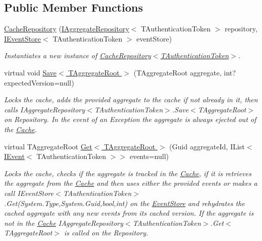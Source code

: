 \subsection*{Public Member Functions}
\begin{DoxyCompactItemize}
\item 
\hyperlink{classCqrs_1_1Cache_1_1CacheRepository_a6c567e999a85f5803a920ce4912833a9_a6c567e999a85f5803a920ce4912833a9}{Cache\+Repository} (\hyperlink{interfaceCqrs_1_1Domain_1_1IAggregateRepository}{I\+Aggregate\+Repository}$<$ T\+Authentication\+Token $>$ repository, \hyperlink{interfaceCqrs_1_1Events_1_1IEventStore}{I\+Event\+Store}$<$ T\+Authentication\+Token $>$ event\+Store)
\begin{DoxyCompactList}\small\item\em Instantiates a new instance of \hyperlink{classCqrs_1_1Cache_1_1CacheRepository_a6c567e999a85f5803a920ce4912833a9_a6c567e999a85f5803a920ce4912833a9}{Cache\+Repository$<$\+T\+Authentication\+Token$>$}. \end{DoxyCompactList}\item 
virtual void \hyperlink{classCqrs_1_1Cache_1_1CacheRepository_a69df7ee1dc2e4cd38431ab987655eab3_a69df7ee1dc2e4cd38431ab987655eab3}{Save$<$ T\+Aggregate\+Root $>$} (T\+Aggregate\+Root aggregate, int? expected\+Version=null)
\begin{DoxyCompactList}\small\item\em Locks the cache, adds the provided {\itshape aggregate}  to the cache if not already in it, then calls I\+Aggregate\+Repository$<$\+T\+Authentication\+Token$>$.\+Save$<$\+T\+Aggregate\+Root$>$ on Repository. In the event of an Exception the {\itshape aggregate}  is always ejected out of the \hyperlink{namespaceCqrs_1_1Cache}{Cache}. \end{DoxyCompactList}\item 
virtual T\+Aggregate\+Root \hyperlink{classCqrs_1_1Cache_1_1CacheRepository_a037acba636aedf23ff376ac0b749ec0c_a037acba636aedf23ff376ac0b749ec0c}{Get$<$ T\+Aggregate\+Root $>$} (Guid aggregate\+Id, I\+List$<$ \hyperlink{interfaceCqrs_1_1Events_1_1IEvent}{I\+Event}$<$ T\+Authentication\+Token $>$$>$ events=null)
\begin{DoxyCompactList}\small\item\em Locks the cache, checks if the aggregate is tracked in the \hyperlink{namespaceCqrs_1_1Cache}{Cache}, if it is retrieves the aggregate from the \hyperlink{namespaceCqrs_1_1Cache}{Cache} and then uses either the provided {\itshape events}  or makes a call I\+Event\+Store$<$\+T\+Authentication\+Token$>$.\+Get(\+System.\+Type,\+System.\+Guid,bool,int) on the \hyperlink{namespaceCqrs_1_1EventStore}{Event\+Store} and rehydrates the cached aggregate with any new events from it\textquotesingle{}s cached version. If the aggregate is not in the \hyperlink{namespaceCqrs_1_1Cache}{Cache} I\+Aggregate\+Repository$<$\+T\+Authentication\+Token$>$.\+Get$<$\+T\+Aggregate\+Root$>$ is called on the Repository. \end{DoxyCompactList}\item 
$$
\end{DoxyCompactItemize}
